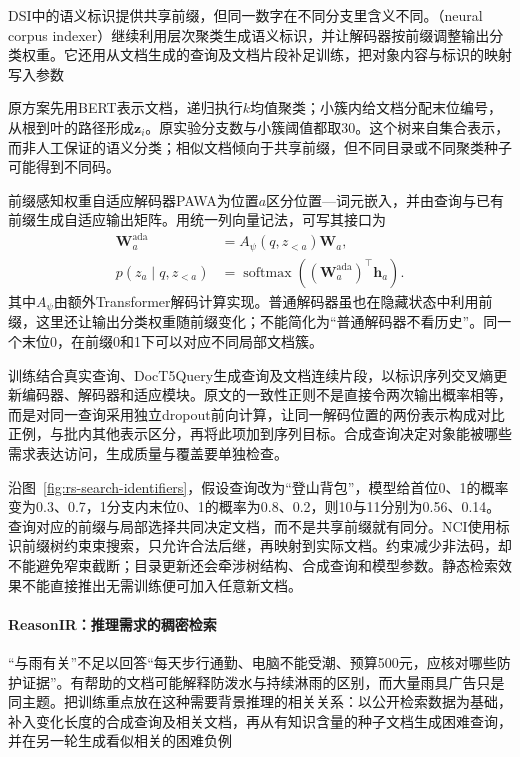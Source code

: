 DSI中的语义标识提供共享前缀，但同一数字在不同分支里含义不同。（neural corpus indexer）继续利用层次聚类生成语义标识，并让解码器按前缀调整输出分类权重。它还用从文档生成的查询及文档片段补足训练，把对象内容与标识的映射写入参数

原方案先用BERT表示文档，递归执行$k$均值聚类；小簇内给文档分配末位编号，从根到叶的路径形成$\bm z_i$。原实验分支数与小簇阈值都取30。这个树来自集合表示，而非人工保证的语义分类；相似文档倾向于共享前缀，但不同目录或不同聚类种子可能得到不同码。

前缀感知权重自适应解码器PAWA为位置$a$区分位置—词元嵌入，并由查询与已有前缀生成自适应输出矩阵。用统一列向量记法，可写其接口为
\begin{equation}
 \begin{split}
 \bm W_a^{\mathrm{ada}}&=A_\psi(q,z_{<a})\bm W_a,\\
 p(z_a\mid q,z_{<a})
 &=\operatorname{softmax}((\bm W_a^{\mathrm{ada}})^\top\bm h_a).
 \end{split}
 \label{eq:rs-search-nci-pawa}
\end{equation}
其中$A_\psi$由额外Transformer解码计算实现。普通解码器虽也在隐藏状态中利用前缀，这里还让输出分类权重随前缀变化；不能简化为“普通解码器不看历史”。同一个末位0，在前缀0和1下可以对应不同局部文档簇。

训练结合真实查询、DocT5Query生成查询及文档连续片段，以标识序列交叉熵更新编码器、解码器和适应模块。原文的一致性正则不是直接令两次输出概率相等，而是对同一查询采用独立dropout前向计算，让同一解码位置的两份表示构成对比正例，与批内其他表示区分，再将此项加到序列目标。合成查询决定对象能被哪些需求表达访问，生成质量与覆盖要单独检查。

沿图~\ref{fig:rs-search-identifiers}，假设查询改为“登山背包”，模型给首位0、1的概率变为0.3、0.7，1分支内末位0、1的概率为0.8、0.2，则10与11分别为0.56、0.14。查询对应的前缀与局部选择共同决定文档，而不是共享前缀就有同分。NCI使用标识前缀树约束束搜索，只允许合法后继，再映射到实际文档。约束减少非法码，却不能避免窄束截断；目录更新还会牵涉树结构、合成查询和模型参数。静态检索效果不能直接推出无需训练便可加入任意新文档。

\Needspace{135mm}
\paragraph{ReasonIR：推理需求的稠密检索}
\label{sec:rs-search-reasonir}

“与雨有关”不足以回答“每天步行通勤、电脑不能受潮、预算500元，应核对哪些防护证据”。有帮助的文档可能解释防泼水与持续淋雨的区别，而大量雨具广告只是同主题。把训练重点放在这种需要背景推理的相关关系：以公开检索数据为基础，补入变化长度的合成查询及相关文档，再从有知识含量的种子文档生成困难查询，并在另一轮生成看似相关的困难负例

